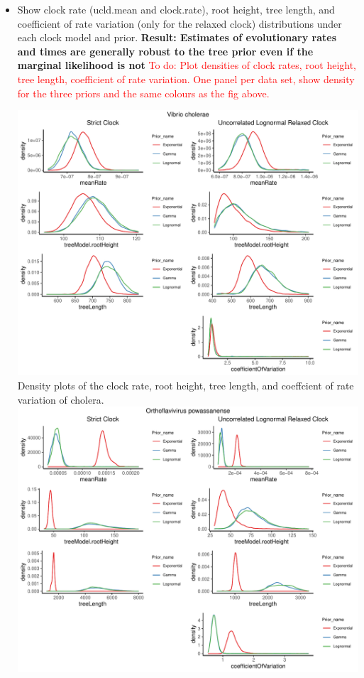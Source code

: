 \documentclass[11pt]{article}
\begin{document}
\begin{itemize}
	\item Show clock rate (ucld.mean and clock.rate), root height, tree length, and coefficient of rate variation (only for the relaxed clock) distributions under each clock model and prior. \textbf{Result: Estimates of evolutionary rates and times are generally robust to the tree prior even if the marginal likelihood is not}
        \subitem \textcolor{red}{To do: Plot densities of clock rates, root height, tree length, coefficient of rate variation. One panel per data set, show density for the three priors and the same colours as the fig above.}
        \begin{center}
            \includegraphics[width=17cm]{sandbox_figures/cholera_density_plot.pdf}\newline
            Density plots of the clock rate, root height, tree length, and coeffcient of rate variation of cholera.
            \includegraphics[width=17cm]{sandbox_figures/powv_density_plot.pdf}\newline

\end{center}
\end{itemize}
\end{document}
